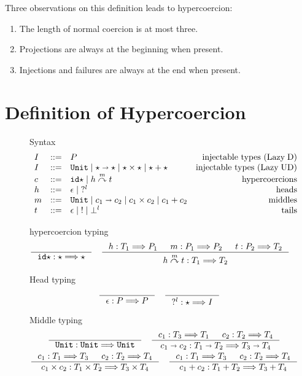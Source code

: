 \documentclass[acmsmall,review,anonymous]{acmart}\settopmatter{printfolios=true,printccs=false,printacmref=false}
\newcommand{\stxrule}[3]{#1 & ::= & #3 & \text{#2}\\}
\newcommand{\plus}[0]{+}
\newcommand{\lazyUD}{Lazy\;UD}
\newcommand{\lazyD}{Lazy\;D}
\newcommand{\TOOdyn}[0]{\star}
\newcommand{\POOunit}[0]{\mathtt{Unit}}
\newcommand{\POOfun}[2]{#1 \shortrightarrow #2}
\newcommand{\POOprod}[2]{#1 \times #2}
\newcommand{\POOsum}[2]{#1 \plus #2}
\newcommand{\typingHC}[3]{#1 : #2 \Longrightarrow #3}
\newcommand{\hyperCoercionI}[0]{\mathtt{id\star}}
\newcommand{\hyperCoercionC}[3]{#1 \overset{#2}{\curvearrowright} #3}
\begin{document}
Three observations on this definition leads to hypercoercion: 
\begin{enumerate}
	\item The length of normal coercion is at most three.
	\item Projections are always at the beginning when present.
	\item Injections and failures are always at the end when present.
\end{enumerate}


\section{Definition of Hypercoercion} \label{sec:hypercoercion-definition}

\begin{figure}
	Syntax
	\[
	\begin{array}{lclr}
	\stxrule{I}{injectable types (\lazyD)}{P}
	\stxrule{I}{injectable types (\lazyUD)}{
		\POOunit \mid
		\POOfun{\TOOdyn}{\TOOdyn} \mid
		\POOprod{\TOOdyn}{\TOOdyn} \mid
		\POOsum{\TOOdyn}{\TOOdyn}
	}
	\stxrule{c}{hypercoercions}{
		\hyperCoercionI \mid{}
		\hyperCoercionC{h}{m}{t}
	}
	\stxrule{h}{heads}{
		\epsilon \mid{}
		?^l
	}
	\stxrule{m}{middles}{
		\POOunit \mid
		\POOfun{c_1}{c_2} \mid
		\POOprod{c_1}{c_2} \mid
		\POOsum{c_1}{c_2}
	}
	\stxrule{t}{tails}{
		\epsilon \mid{}
		! \mid{}
		\bot^l
	}
	\end{array}
	\]
		
	hypercoercion typing 
	\begin{gather*}
	\inference{}{\typingHC{\hyperCoercionI}{\TOOdyn}{\TOOdyn}}
	\quad
	\inference{
		\typingHC{h}{T_1}{P_1} &
		\typingHC{m}{P_1}{P_2} &
		\typingHC{t}{P_2}{T_2}
	}{
		\typingHC{\hyperCoercionC{h}{m}{t}}{T_1}{T_2}
	}
	\end{gather*}
	
	Head typing \fbox{$ \typingHC{h}{T}{P} $}
	\begin{gather*}
	\inference{}{\typingHC{\epsilon}{P}{P}}
	\quad
	\inference{}{\typingHC{?^l}{\TOOdyn}{I}}
	\end{gather*}
	
	Middle typing \fbox{$ \typingHC{m}{T}{T} $}
	\begin{gather*}
	\inference{}{\typingHC{\POOunit}{\POOunit}{\POOunit}}
	\quad
	\inference{
		\typingHC{c_1}{T_3}{T_1} &
		\typingHC{c_2}{T_2}{T_4}
	}{
		\typingHC{\POOfun{c_1}{c_2}}{\POOfun{T_1}{T_2}}{\POOfun{T_3}{T_4}}
	}
	\\
	\inference{
		\typingHC{c_1}{T_1}{T_3} &
		\typingHC{c_2}{T_2}{T_4}
	}{
		\typingHC{\POOprod{c_1}{c_2}}{\POOprod{T_1}{T_2}}{\POOprod{T_3}{T_4}}
	}
	\quad
	\inference{
		\typingHC{c_1}{T_1}{T_3} &
		\typingHC{c_2}{T_2}{T_4}
	}{
		\typingHC{\POOsum{c_1}{c_2}}{\POOsum{T_1}{T_2}}{\POOsum{T_3}{T_4}}
	}
		\end{gather*}
		

\end{figure}
\end{document}
